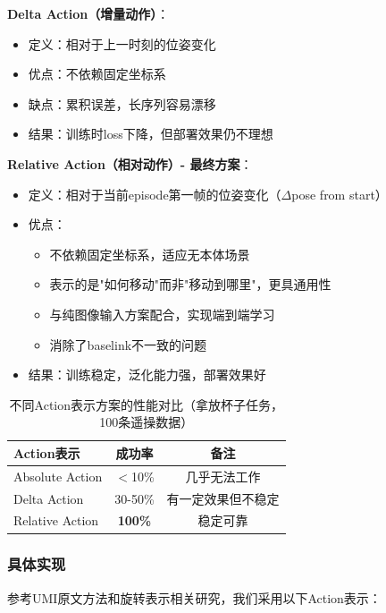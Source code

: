 \textbf{Delta Action（增量动作）}：
\begin{itemize}[leftmargin=2em]
    \item 定义：相对于上一时刻的位姿变化
    \item 优点：不依赖固定坐标系
    \item 缺点：累积误差，长序列容易漂移
    \item 结果：训练时loss下降，但部署效果仍不理想
\end{itemize}

\textbf{Relative Action（相对动作）- 最终方案}：
\begin{itemize}[leftmargin=2em]
    \item 定义：相对于当前episode第一帧的位姿变化（$\Delta$pose from start）
    \item 优点：
    \begin{itemize}
        \item 不依赖固定坐标系，适应无本体场景
        \item 表示的是"如何移动"而非"移动到哪里"，更具通用性
        \item 与纯图像输入方案配合，实现端到端学习
        \item 消除了baselink不一致的问题
    \end{itemize}
    \item 结果：训练稳定，泛化能力强，部署效果好
\end{itemize}

\begin{table}[htbp]
\centering
\caption{不同Action表示方案的性能对比（拿放杯子任务，100条遥操数据）}
\label{tab:action_representation}
\begin{tabular}{lcc}
\toprule
Action表示 & 成功率 & 备注 \\
\midrule
Absolute Action & $<$10\% & 几乎无法工作 \\
Delta Action & 30-50\% & 有一定效果但不稳定 \\
Relative Action & \textbf{100\%} & 稳定可靠 \\
\bottomrule
\end{tabular}
\end{table}

\subsubsection{具体实现}

参考UMI原文方法\cite{chi2024umi}和旋转表示相关研究\cite{saxena2008mathematical,zhou2019continuity}，我们采用以下Action表示：

